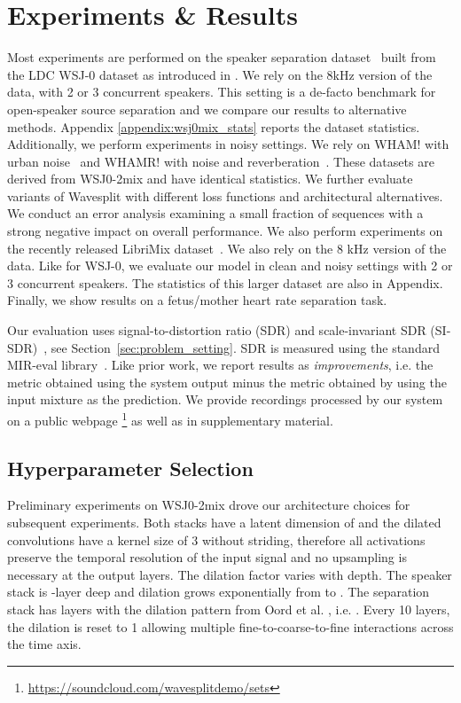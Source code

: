 \documentclass[letterpaper, onecolumn,10 pt]{IEEEtran}
\begin{document}
\section{Experiments \& Results}
\label{sec:experiments}

Most experiments are performed on the speaker separation dataset~\cite{wsj0_2mix_dataset}
built from the LDC WSJ-0 dataset \cite{garofolo93:wsj0} as introduced in \cite{hershey16:deep_clustering}. We rely on the 8kHz version of the data, with 2 or 3 concurrent speakers. This setting is a de-facto benchmark for open-speaker source 
separation and we compare our results to alternative methods. Appendix \ref{appendix:wsj0mix_stats} reports
the dataset statistics. Additionally, we perform experiments in noisy settings. We rely
on WHAM! with urban noise~\cite{wichern19:WHAM} and WHAMR! with noise and reverberation~\cite{maciejewski19:whamr}. 
These datasets are derived from WSJ0-2mix and have identical statistics.
We further evaluate variants of Wavesplit with different loss functions and architectural alternatives. 
We conduct an error analysis examining a small fraction of sequences with a strong 
negative impact on overall performance. We also perform experiments on the recently released LibriMix dataset~\cite{librimix}. We also rely on the 8 kHz version of the data. Like for WSJ-0, we evaluate our model in clean and noisy settings with 2 or 3 concurrent speakers. The statistics of this larger dataset are also in Appendix. Finally, we show results on a fetus/mother heart rate separation task.

Our evaluation uses signal-to-distortion ratio (SDR) and scale-invariant 
SDR (SI-SDR)~\cite{vincent06:bss,leroux19:sdr}, see Section~\ref{sec:problem_setting}. 
SDR is measured using the standard MIR-eval library~\cite{mir_eval}.
Like prior work, we report results as \textit{improvements}, i.e. the metric obtained using the system 
output minus the metric obtained by using the input mixture as the prediction.  We provide recordings processed by our system on a public webpage \footnote{\url{https://soundcloud.com/wavesplitdemo/sets}} as well as in supplementary material.

\subsection{Hyperparameter Selection}

Preliminary experiments on WSJ0-2mix \cite{hershey16:deep_clustering} drove our architecture choices for subsequent experiments. 
Both stacks have a latent dimension of  and the dilated convolutions have a kernel size of 3 without striding, therefore all activations preserve the temporal resolution of the input signal and no upsampling is necessary at the output layers. The dilation factor varies with depth. The speaker stack is -layer deep and dilation grows exponentially from  to . The separation stack has  layers with the dilation pattern from Oord et al. \cite{oord:wavenet}, i.e. . Every 10 layers, the dilation is reset to 1 allowing multiple fine-to-coarse-to-fine interactions across the time axis.
\end{document}
